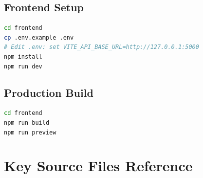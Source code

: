 \subsection{Frontend Setup}

\begin{lstlisting}[language=bash, caption={Frontend installation and startup}]
cd frontend
cp .env.example .env
# Edit .env: set VITE_API_BASE_URL=http://127.0.0.1:5000
npm install
npm run dev
\end{lstlisting}

\subsection{Production Build}

\begin{lstlisting}[language=bash, caption={Frontend production build}]
cd frontend
npm run build
npm run preview
\end{lstlisting}

\section{Key Source Files Reference}
\label{app:source-files}

